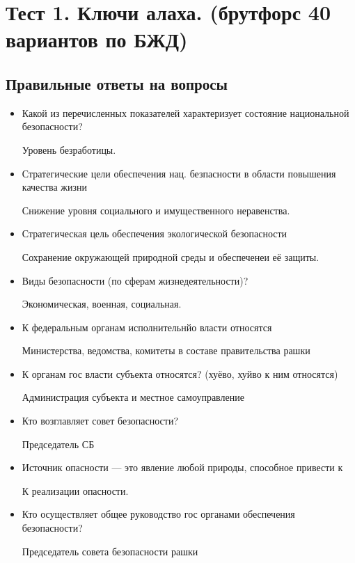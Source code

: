\documentclass[oneside,final,14pt]{extreport}
\begin{document}
\section*{Тест 1. Ключи алаха. (брутфорс 40 вариантов по БЖД)}
\subsection*{Правильные ответы на вопросы}
\begin{itemize}
	\item Какой из перечисленных показателей характеризует состояние национальной безопасности?
	
	Уровень безработицы.
	
	\item Стратегические цели обеспечения  нац. безпасности  в области повышения качества жизни
	
	Снижение уровня социального и имущественного неравенства.
	
	
	\item Стратегическая цель обеспечения экологической безопасности
	
	Сохранение окружающей природной среды и обеспеченеи её защиты.
	
	\item Виды безопасности (по сферам жизнедеятельности)?
	
	Экономическая, военная, социальная.
	
	\item К федеральным органам исполнительнйо власти относятся
	
	Министерства, ведомства, комитеты в составе правительства рашки
	
	\item К органам гос власти субъекта относятся? (хуёво, хуйво к ним относятся)
	
	Администрация субъекта и местное самоуправление
	
	\item Кто возглавляет совет безопасности?
	
	Председатель СБ
	
	\item Источник опасности --- это явление любой природы, способное привести к
	
	К реализации опасности.
	
	\item Кто осуществляет общее руководство гос органами обеспечения безопасности?
	
	Председатель совета безопасности рашки
	

\end{itemize}
\end{document}
